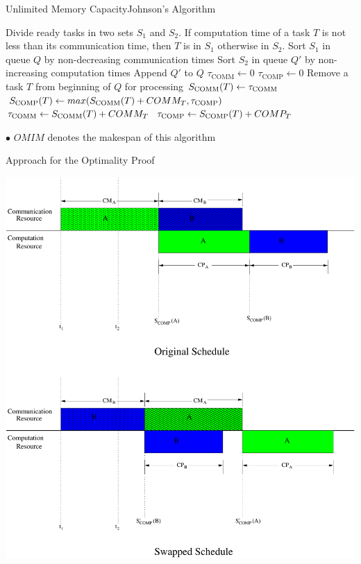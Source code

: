 \documentclass[mathserif,hyperref={pdfpagemode=FullScreen}]{beamer}
\begin{document}
\begin{frame}{Unlimited Memory Capacity}{Johnson's Algorithm}
\begin{algorithm}[H]
\begin{algorithmic}[1]
	\STATE Divide ready tasks in two sets $S_1$ and $S_2$. If computation time of a task $T$ is not less than its communication time, then $T$ is in $S_1$ otherwise in $S_2$.
	\STATE Sort $S_1$ in queue $Q$ by non-decreasing communication times
	\STATE Sort $S_2$ in queue $Q'$ by non-increasing computation times
	\STATE Append $Q'$ to $Q$
	\STATE $\tau_{\text{COMM}} \gets 0$ \hfill{}
	\STATE $\tau_{\text{COMP}} \gets 0$\hfill {}
	\STATE Remove a task $T$ from beginning of $Q$ for processing
	\STATE ${S}_{\text{COMM}}(T) \gets \tau_{\text{COMM}}$
	\STATE ${S}_{\text{COMP}}(T) \gets max({S}_{\text{COMM}}(T) + COMM_T, \tau_{\text{COMP}})$
	\STATE $\tau_{\text{COMM}} \gets {S}_{\text{COMM}}(T) + COMM_T$
	\STATE $\tau_{\text{COMP}} \gets {S}_{\text{COMP}}(T) + COMP_T$
	\ENDWHILE
\end{algorithmic}
\end{algorithm}
$\bullet$ $OMIM$ denotes the makespan of this algorithm
\end{frame}


\begin{frame}{Approach for the Optimality Proof}
\vspace*{-0.5cm}
\begin{center}
\includegraphics[scale=0.32]{./diagrams/original_swapped_schedules-eps-converted-to.pdf}
\end{center}

\end{frame}
\end{document}
